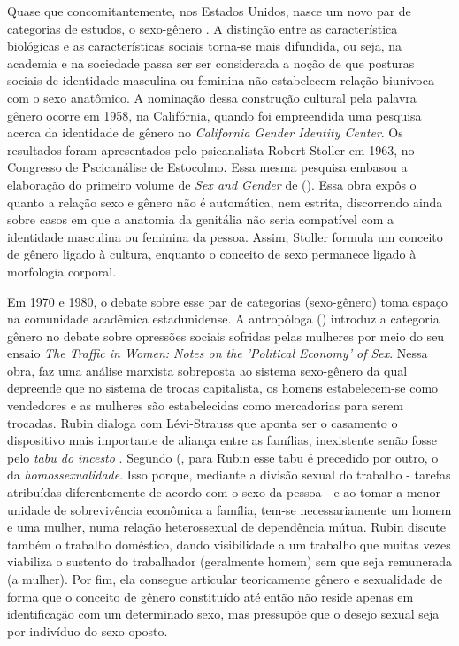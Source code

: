 Quase que concomitantemente, nos Estados Unidos, nasce um novo par de categorias de estudos, o sexo-gênero \cite{FRAISSE2001,STOLKE2004,HARAWAY2004}. A distinção entre as característica biológicas e as características sociais torna-se mais difundida, ou seja, na academia e na sociedade passa ser ser considerada a noção de que posturas sociais de identidade masculina ou feminina não estabelecem relação biunívoca com o sexo anatômico.
A nominação dessa construção cultural pela palavra gênero ocorre em 1958, na Califórnia, quando foi empreendida uma pesquisa acerca da identidade de gênero no \emph{California Gender Identity Center}. Os resultados foram apresentados pelo psicanalista Robert Stoller em 1963, no Congresso de Pscicanálise de Estocolmo. Essa mesma pesquisa embasou a elaboração do primeiro volume de \emph{Sex and Gender} de  (\citeyear{STOLLER1968}). Essa obra expôs o quanto a relação sexo e gênero não é automática, nem estrita, discorrendo ainda sobre casos em que a anatomia da genitália não seria compatível com a identidade masculina ou feminina da pessoa. Assim, Stoller formula um conceito de gênero ligado à cultura, enquanto o conceito de sexo permanece ligado à morfologia corporal.

Em 1970 e 1980, o debate sobre esse par de categorias (sexo-gênero) toma espaço na comunidade acadêmica estadunidense. A antropóloga  (\citeyear{RUBIN1975})  introduz a categoria gênero no debate sobre opressões sociais sofridas pelas mulheres por meio do seu ensaio \emph{The Traffic in Women: Notes on the 'Political Economy' of Sex}. Nessa obra,  faz uma análise marxista sobreposta ao sistema sexo-gênero da qual depreende que no sistema de trocas capitalista, os homens estabelecem-se como vendedores e as mulheres são estabelecidas como mercadorias para serem trocadas.
Rubin dialoga com Lévi-Strauss que aponta ser o casamento o dispositivo mais importante de aliança entre as famílias, inexistente senão fosse pelo \emph{tabu do incesto} \cite{STRAUSS2010}. Segundo  (\citeyear{PISCITELLI2009}, para Rubin esse tabu é precedido por outro, o da \emph{homossexualidade}. Isso porque, mediante a divisão sexual do trabalho - tarefas atribuídas diferentemente de acordo com o sexo da pessoa - e ao tomar a menor unidade de sobrevivência econômica a família, tem-se necessariamente um homem e uma mulher, numa relação heterossexual de dependência mútua. Rubin discute também o trabalho doméstico, dando visibilidade a um trabalho que muitas vezes viabiliza o sustento do trabalhador (geralmente homem) sem que seja remunerada (a mulher). Por fim, ela consegue articular teoricamente gênero e sexualidade de forma que o conceito de gênero constituído até então não reside apenas em identificação com um determinado sexo, mas pressupõe que o desejo sexual seja por indivíduo do sexo oposto. 


